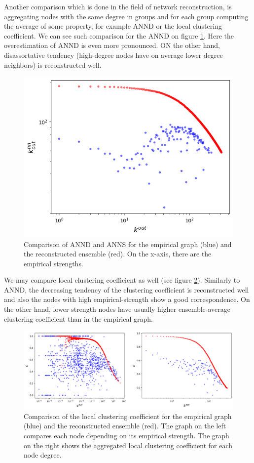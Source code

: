 Another comparison which is done in the field of network reconstruction, is aggregating nodes with the same degree in groups and for each group computing the average of some property, for example ANND or the local clustering coefficient. We can see such comparison for the ANND on figure \ref*{fig:ANND_k}. Here the overestimation of ANND is even more pronounced. ON the other hand, disassortative tendency (high-degree nodes have on average lower degree neighbors) is reconstructed well.

\begin{figure}[!ht]
    \centering
    \includegraphics[scale=0.5]{../img/vanilla_SIM/ANND_k.png}
    \caption{Comparison of ANND and ANNS for the empirical graph (blue) and the reconstructed ensemble (red). On the x-axis, there are the empirical strengths.}
    \label{fig:ANND_k}
\end{figure}

We may compare local clustering coefficient as well (see figure \ref*{fig:cl_coeff}). Similarly to ANND, the decreasing tendency of the clustering coefficient is reconstructed well and also the nodes with high empirical-strength show a good correspondence. On the other hand, lower strength nodes have usually higher ensemble-average clustering coefficient than in the empirical graph.

\begin{figure}[!ht]
    \centering
    \includegraphics[scale=0.5]{../img/vanilla_SIM/cl_coeff.png}
    \caption{Comparison of the local clustering coefficient for the empirical graph (blue) and the reconstructed ensemble (red). The graph on the left compares each node depending on its empirical strength. The graph on the right shows the aggregated local clustering coefficient for each node degree.}
    \label{fig:cl_coeff}
\end{figure}


